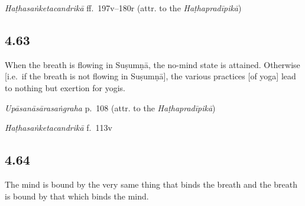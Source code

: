 \begin{ekdosis}
\begin{testimonia}[hp04_062]
\emph{Haṭhasaṅketacandrikā} ff.~197v–180r (attr. to the \emph{Haṭhapradīpikā})
\begin{versinnote}
\end{versinnote}
\end{testimonia}


\subsection*{4.63}
\begin{translation}[hp04_063]
When the breath is flowing in Suṣumṇā, the no-mind state is attained. Otherwise [i.e.~if the breath is not flowing in Suṣumṇā], the various practices [of yoga] lead to nothing but exertion for yogis.
\end{translation}%


\begin{testimonia}[hp04_063]
\emph{Upāsanāsārasaṅgraha} p.~108 (attr. to the \emph{Haṭhapradīpikā})
\begin{versinnote}
\end{versinnote}

\emph{Haṭhasaṅketacandrikā} f.~113v
\begin{versinnote}
\end{versinnote}
\end{testimonia}


\subsection*{4.64}
\begin{translation}[hp04_064]
The mind is bound by the very same thing that binds the breath and the breath is bound by that which binds the mind.
\end{translation}


\end{ekdosis}
